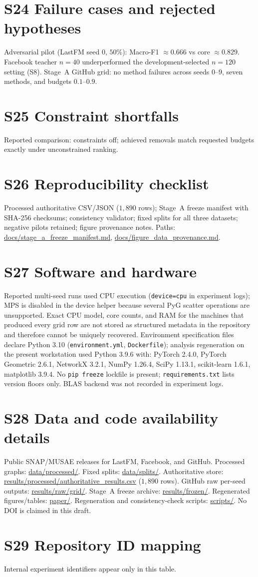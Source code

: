 \documentclass[11pt,a4paper]{article}
\providecommand{\path}[1]{\url{#1}}
\begin{document}
\section{S24 Failure cases and rejected hypotheses}
Adversarial pilot (LastFM seed 0, $50\%$): Macro-F1 $\approx0.666$ vs core $\approx0.829$.
Facebook teacher $n{=}40$ underperformed the development-selected $n{=}120$ setting (S8).
Stage~A GitHub grid: no method failures across seeds $0$--$9$, seven methods, and budgets $0.1$--$0.9$.

\section{S25 Constraint shortfalls}
Reported comparison: constraints off; achieved removals match requested budgets exactly under unconstrained ranking.

\section{S26 Reproducibility checklist}
Processed authoritative CSV/JSON ($1{,}890$ rows); Stage~A freeze manifest with SHA-256 checksums; consistency validator; fixed splits for all three datasets; negative pilots retained; figure provenance notes.
Paths: \path{docs/stage_a_freeze_manifest.md}, \path{docs/figure_data_provenance.md}.

\section{S27 Software and hardware}
Reported multi-seed runs used CPU execution (\texttt{device=cpu} in experiment logs); MPS is disabled in the device helper because several PyG scatter operations are unsupported.
Exact CPU model, core counts, and RAM for the machines that produced every grid row are not stored as structured metadata in the repository and therefore cannot be uniquely recovered.
Environment specification files declare Python 3.10 (\texttt{environment.yml}, \texttt{Dockerfile}); analysis regeneration on the present workstation used Python 3.9.6 with:
PyTorch 2.4.0, PyTorch Geometric 2.6.1, NetworkX 3.2.1, NumPy 1.26.4, SciPy 1.13.1, scikit-learn 1.6.1, matplotlib 3.9.4.
No \texttt{pip freeze} lockfile is present; \texttt{requirements.txt} lists version floors only.
BLAS backend was not recorded in experiment logs.

\section{S28 Data and code availability details}
Public SNAP/MUSAE releases for LastFM, Facebook, and GitHub.
Processed graphs: \path{data/processed/}.
Fixed splits: \path{data/splits/}.
Authoritative store: \path{results/processed/authoritative_results.csv} ($1{,}890$ rows).
GitHub raw per-seed outputs: \path{results/raw/grid/}.
Stage~A freeze archive: \path{results/frozen/}.
Regenerated figures/tables: \path{paper/}.
Regeneration and consistency-check scripts: \path{scripts/}.
No DOI is claimed in this draft.

\section{S29 Repository ID mapping}
Internal experiment identifiers appear only in this table.




\end{document}
